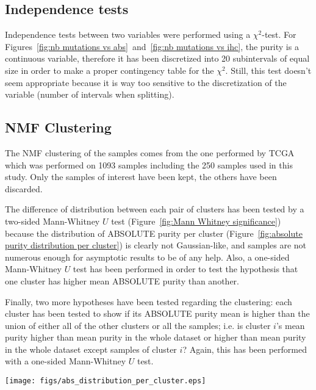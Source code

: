 \documentclass[letterpaper]{article}
\begin{document}
\subsection{Independence tests}
Independence tests between two variables were performed using a $\chi^2$-test. For Figures~\ref{fig:nb mutations vs abs}~and~\ref{fig:nb mutations vs ihc}, the purity is a
continuous variable, therefore it has been discretized into 20 subintervals of equal size in order to make a proper contingency table for the $\chi^2$. Still, this test
doesn't seem appropriate because it is way too sensitive to the discretization of the variable (number of intervals when splitting).

\subsection{NMF Clustering}
The NMF clustering of the samples comes from the one performed by TCGA which was performed on 1093 samples including the 250 samples used in this study. Only the samples
of interest have been kept, the others have been discarded.

The difference of distribution between each pair of clusters has been tested by a two-sided Mann-Whitney $U$ test (Figure~\ref{fig:Mann Whitney significance}) because
the distribution of ABSOLUTE purity per cluster (Figure~\ref{fig:absolute purity distribution per cluster}) is clearly not Gaussian-like, and samples are not numerous enough
for asymptotic results to be of any help. Also, a one-sided Mann-Whitney $U$ test has been performed in order to test the hypothesis that one cluster has higher mean ABSOLUTE
purity than another.

Finally, two more hypotheses have been tested regarding the clustering: each cluster has been tested to show if its ABSOLUTE purity mean is higher than the union of either
all of the other clusters or all the samples; i.e. is cluster $i$'s mean purity higher than mean purity in the whole dataset or higher than mean purity in the whole dataset
except samples of cluster $i$? Again, this has been performed with a one-sided Mann-Whitney $U$ test.

\begin{figure*}[!t]
\texttt{[image: figs/abs\_distribution\_per\_cluster.eps]}
\caption{Distribution of the ABSOLUTE purity for each cluster.\label{fig:absolute purity distribution per cluster}}
\end{figure*}
\end{document}
